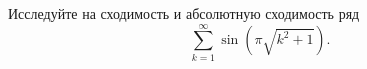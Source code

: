 \documentclass{article}
\begin{document}
Исследуйте на сходимость и абсолютную сходимость ряд
$$\sum\limits_{k=1}^\infty \sin \left( \pi \sqrt{k^2 + 1} \right).$$
\end{document}
